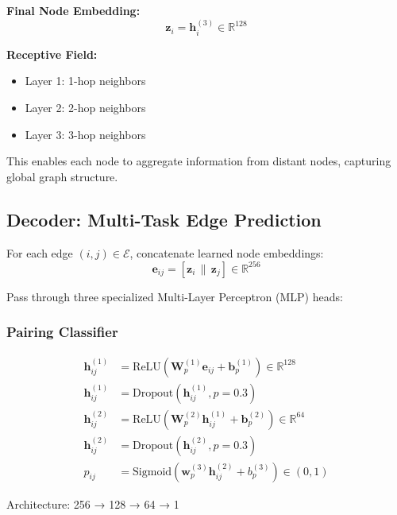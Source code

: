 \textbf{Final Node Embedding:}
\begin{equation}
\mathbf{z}_i = \mathbf{h}_i^{(3)} \in \mathbb{R}^{128}
\end{equation}

\textbf{Receptive Field:}
\begin{itemize}
    \item Layer 1: 1-hop neighbors
    \item Layer 2: 2-hop neighbors
    \item Layer 3: 3-hop neighbors
\end{itemize}

This enables each node to aggregate information from distant nodes, capturing global graph structure.

\subsection{Decoder: Multi-Task Edge Prediction}

For each edge $(i,j) \in \mathcal{E}$, concatenate learned node embeddings:
\begin{equation}
\mathbf{e}_{ij} = [\mathbf{z}_i \, \| \, \mathbf{z}_j] \in \mathbb{R}^{256}
\end{equation}

Pass through three specialized Multi-Layer Perceptron (MLP) heads:

\subsubsection{Pairing Classifier}

\begin{equation}
\begin{aligned}
\mathbf{h}_{ij}^{(1)} &= \text{ReLU}(\mathbf{W}_p^{(1)} \mathbf{e}_{ij} + \mathbf{b}_p^{(1)}) \in \mathbb{R}^{128} \\
\mathbf{h}_{ij}^{(1)} &= \text{Dropout}(\mathbf{h}_{ij}^{(1)}, p=0.3) \\
\mathbf{h}_{ij}^{(2)} &= \text{ReLU}(\mathbf{W}_p^{(2)} \mathbf{h}_{ij}^{(1)} + \mathbf{b}_p^{(2)}) \in \mathbb{R}^{64} \\
\mathbf{h}_{ij}^{(2)} &= \text{Dropout}(\mathbf{h}_{ij}^{(2)}, p=0.3) \\
p_{ij} &= \text{Sigmoid}(\mathbf{w}_p^{(3)} \mathbf{h}_{ij}^{(2)} + b_p^{(3)}) \in (0,1)
\end{aligned}
\end{equation}

Architecture: 256 → 128 → 64 → 1

